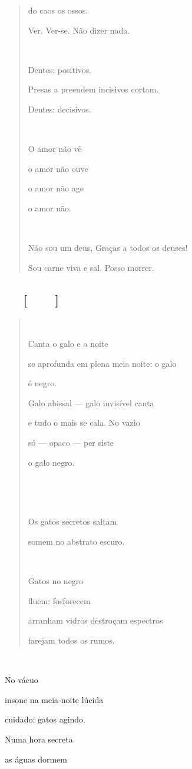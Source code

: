 \begin{quote}
do caos os ossos.

Ver. Ver-se. Não dizer nada.

 

Dentes: positivos.

Presas a preendem incisivos cortam.

Dentes: decisivos.

 

O amor não vê

o amor não ouve

o amor não age

o amor não.



Não sou um deus, Graças a todos os deuses!

Sou carne viva e sal. Posso morrer.
\end{quote}

\subsection{ {[}{]}}\label{section-12}

\begin{quote}


Canta o galo e a noite

se aprofunda em plena meia noite: o galo

é negro.

Galo abissal --- galo invisível canta

e tudo o mais se cala. No vazio

só --- opaco --- per siste

o galo negro.





Os gatos secretos saltam

somem no abstrato escuro.



Gatos no negro

fluem: fosforecem

arranham vidros destroçam espectros

farejam todos os rumos.
\end{quote}



No vácuo

insone na meia-noite lúcida

cuidado: gatos agindo.

Numa hora secreta

as águas dormem


